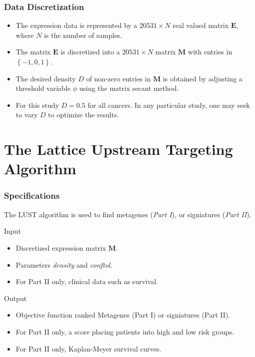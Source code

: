 \documentclass[
	11pt, %
]{beamer}
\begin{document}
\begin{frame}
	\frametitle{Data Discretization}
	
	\begin{itemize}
        \item The expression data is represented by a $20531 \times N$ real valued matrix $\mathbf{E}$, where $N$ is the number of samples.
        \item The matrix $\mathbf{E}$ is discretized into a $20531 \times N$ matrix $\mathbf{M}$ with entries in $\left\{ -1, 0, 1\right\}$.
        \item The desired density $D$ of non-zero entries in $\mathbf{M}$ is obtained by adjusting a threshold variable $\phi$ using the matrix secant method.
        \item For this study $D = 0.5$ for all cancers. In any particular study, one may seek to vary $D$ to optimize the results.
    \end{itemize}
\end{frame}


\section{The Lattice Upstream Targeting Algorithm}

\begin{frame}
	\frametitle{Specifications}
	
	\begin{block}{}
        The LUST algorithm is used to find metagenes (\emph{Part I}), or signiatures (\emph{Part II}).
    \end{block}

    \begin{block}{Input}
        \begin{itemize}
            \item Discretized expression matrix $\mathbf{M}$.
            \item Parameters \emph{density} and \emph{conftol}.
            \item For Part II only, clinical data such as survival.
        \end{itemize}
    \end{block}

    \begin{block}{Output}
        \begin{itemize}
            \item Objective function ranked Metagenes (Part I) or signiatures (Part II).
            \item For Part II only, a score placing patients into high and low risk groups.
            \item For Part II only, Kaplan-Meyer survival curves.
        \end{itemize}
    \end{block}
\end{frame}
\end{document}
